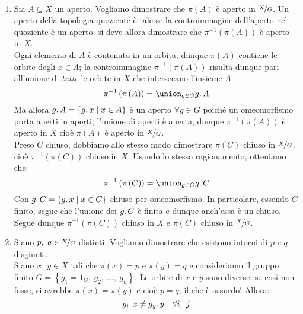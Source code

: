 \begin{demonstration}~{}
\begin{enumerate}[label=\Roman*]
\item Sia $A\subseteq X$ un aperto. Vogliamo dimostrare che $\pi\left(A\right)$ è aperto in $\nicefrac{X}{G}$. Un aperto della topologia quoziente è tale se la controimmagine dell'aperto nel quoziente è un aperto: si deve allora dimostrare che $\pi^{-1}\left(\pi\left(A\right)\right)$ è aperto in $X$.\\
Ogni elemento di $A$ è contenuto in un orbita, dunque $\pi\left(A\right)$ contiene le orbite degli $x\in A$; la controimmagine $\pi^{-1}\left(\pi\left(A\right)\right)$ risulta dunque pari all'unione di \textit{tutte} le orbite in $X$ che intersecano l'insieme $A$:
\begin{equation*}
\pi^{-1}\left(\pi\left(A\right)\right)=\union_{g\in G} g\ldotp A
\end{equation*}
Ma allora $g\ldotp A=\left\{g\ldotp x\mid x\in A\right\}$ è un aperto $\forall g\in G$ poiché un omeomorfismo porta aperti in aperti; l'unione di aperti è aperta, dunque $\pi^{-1}\left(\pi\left(A\right)\right)$ è aperto in $X$ cioè $\pi\left(A\right)$ è aperto in $\nicefrac{X}{G}$.\\
Preso $C$ chiuso, dobbiamo allo stesso modo dimostrare $\pi\left(C\right)$ chiuso in $\nicefrac{X}{G}$, cioè $\pi^{-1}\left(\pi\left(C\right)\right)$ chiuso in $X$. Usando lo stesso ragionamento, otteniamo che:
\begin{equation*}
	\pi^{-1}\left(\pi\left(C\right)\right)=\union_{g\in G} g\ldotp C
\end{equation*} 
Con $g\ldotp C=\left\{g\ldotp x\mid x\in C\right\}$ chiuso per omeomorfismo. In particolare, essendo $G$ finito, segue che l'unione dei $g\ldotp C$ è finita e dunque anch'essa è un chiuso. Segue dunque $\pi^{-1}\left(\pi\left(C\right)\right)$ chiuso in $X$ e $\pi\left(C\right)$ chiuso in $\nicefrac{X}{G}$.
\item Siano $p,\ q\in \nicefrac{X}{G}$ distinti. Vogliamo dimostrare che esistono intorni di $p$ e $q$ disgiunti.\\
Siano $x,\ y\in X$ tali che $\pi\left(x\right)=p$ e $\pi\left(y\right)=q$ e consideriamo il gruppo finito $G=\left\{g_1=1_G,\ g_2,\ \ldots,\ g_n\right\}$. Le orbite di $x$ e $y$ sono diverse: se così non fosse, si avrebbe $\pi\left(x\right)=\pi\left(y\right)$ e cioè $p=q$, il che è assurdo! Allora:
\begin{equation*}
g_i\ldotp x\neq g_y\ldotp y\quad \forall i,\ j
\end{equation*}

\end{enumerate}
\end{demonstration}
